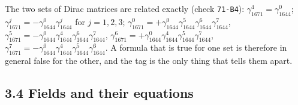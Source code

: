 \documentclass[
  10pt,
]{article}
\begin{document}
The two sets of Dirac matrices are related exactly (check
\texttt{71-B4}): \(\gamma_{1671}^4=\gamma_{1644}^0\);
\(\gamma_{1671}^j=-\gamma_{1644}^0\gamma_{1644}^j\) for \(j=1,2,3\);
\(\gamma_{1671}^0=+\gamma_{1644}^0\gamma_{1644}^5\gamma_{1644}^6\gamma_{1644}^7\),
\(\gamma_{1671}^5=-\gamma_{1644}^0\gamma_{1644}^4\gamma_{1644}^6\gamma_{1644}^7\),
\(\gamma_{1671}^6=+\gamma_{1644}^0\gamma_{1644}^4\gamma_{1644}^5\gamma_{1644}^7\),
\(\gamma_{1671}^7=-\gamma_{1644}^0\gamma_{1644}^4\gamma_{1644}^5\gamma_{1644}^6\).
A formula that is true for one set is therefore in general false for the
other, and the tag is the only thing that tells them apart.

\hypertarget{fields-and-their-equations}{%
\subsection{3.4 Fields and their
equations}\label{fields-and-their-equations}}
\end{document}
